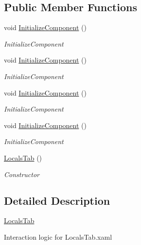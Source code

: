 \subsection*{Public Member Functions}
\begin{DoxyCompactItemize}
\item 
void \hyperlink{class_baudi_1_1_client_1_1_view_1_1_tabs_1_1_locals_tab_abb12cb60939a6fa8998dbd716f88c523}{Initialize\+Component} ()
\begin{DoxyCompactList}\small\item\em Initialize\+Component \end{DoxyCompactList}\item 
void \hyperlink{class_baudi_1_1_client_1_1_view_1_1_tabs_1_1_locals_tab_abb12cb60939a6fa8998dbd716f88c523}{Initialize\+Component} ()
\begin{DoxyCompactList}\small\item\em Initialize\+Component \end{DoxyCompactList}\item 
void \hyperlink{class_baudi_1_1_client_1_1_view_1_1_tabs_1_1_locals_tab_abb12cb60939a6fa8998dbd716f88c523}{Initialize\+Component} ()
\begin{DoxyCompactList}\small\item\em Initialize\+Component \end{DoxyCompactList}\item 
void \hyperlink{class_baudi_1_1_client_1_1_view_1_1_tabs_1_1_locals_tab_abb12cb60939a6fa8998dbd716f88c523}{Initialize\+Component} ()
\begin{DoxyCompactList}\small\item\em Initialize\+Component \end{DoxyCompactList}\item 
\hyperlink{class_baudi_1_1_client_1_1_view_1_1_tabs_1_1_locals_tab_ac3ab021561575f11b25334a4b0ce806f}{Locals\+Tab} ()
\begin{DoxyCompactList}\small\item\em Constructor \end{DoxyCompactList}\end{DoxyCompactItemize}


\subsection{Detailed Description}
\hyperlink{class_baudi_1_1_client_1_1_view_1_1_tabs_1_1_locals_tab}{Locals\+Tab} 

Interaction logic for Locals\+Tab.\+xaml 

